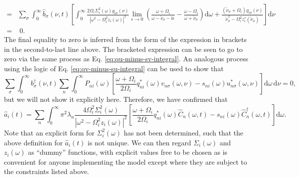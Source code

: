 \begin{equation}
\begin{split}
= &\sum_\sigma\int_0^\infty\hat{b}_\sigma(\nu,t)\left[\int_0^\infty\frac{2\Omega_i\Sigma_i^2(\omega)g_{i\sigma}(\nu)}{|\omega^2 - \Omega_i^2z_i(\omega)|^2}\lim_{\epsilon\to0}\left(\frac{\omega + \Omega_i}{\omega - \tilde{\nu}_\sigma - \mathrm{i}\epsilon} - \frac{\omega - \Omega_i}{\omega + \tilde{\nu}_\sigma}\right)\mathrm{d}\omega + \frac{(\tilde{\nu}_\sigma + \Omega_i)g_{i\sigma}(\nu)}{\tilde{\nu}_\sigma^2 - \Omega_i^2z_i^*(\tilde{\nu}_\sigma)}\right]\mathrm{d}\nu\\
= &\;0.
\end{split}
\end{equation}
The final equality to zero is inferred from the form of the expression in brackets in the second-to-last line above. The bracketed expression can be seen to go to zero via the same process as Eq. \eqref{eq:qu-minus-sv-integral}. An analogous process using the logic of Eq. \eqref{eq:qv-minus-su-integral} can be used to show that 
\begin{equation}
\sum_\sigma\int_0^\infty b_\sigma^\dagger(\nu,t)\sum_n\int_0^\infty P_{ni}(\omega)\left[\frac{\omega + \Omega_i}{2\Omega_i}q_{ni}^*(\omega)v_{n\sigma}(\omega,\nu) - s_{ni}(\omega)u_{n\sigma}^*(\omega,\nu)\right]\mathrm{d}\omega\,\mathrm{d}\nu = 0,
\end{equation}
but we will not show it explicitly here. Therefore, we have confirmed that
\begin{equation}
\hat{a}_i(t) = \sum_n\int_0^\infty \pi^2\lambda_n\frac{4\Omega_i^2\Sigma_i^2(\omega)}{|\omega^2 - \Omega_i^2z_i(\omega)|^2}\left[\frac{\omega + \Omega_i}{2\Omega_i}q_{ni}^*(\omega)\hat{C}_n(\omega,t) - s_{ni}(\omega)\hat{C}_n^\dagger(\omega,t)\right]\mathrm{d}\omega.
\end{equation}
Note that an explicit form for $\Sigma_i^2(\omega)$ has not been determined, such that the above definition for $\hat{a}_i(t)$ is not unique. We can then regard $\Sigma_i(\omega)$ and $z_i(\omega)$ as ``dummy'' functions, with explicit values free to be chosen as is convenient for anyone implementing the model except where they are subject to the constraints listed above.

